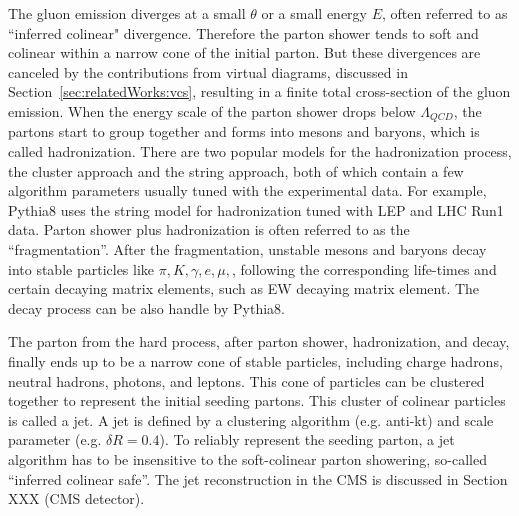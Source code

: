 \noindent The gluon emission diverges at a small $\theta$ or a small energy $E$, often referred to as ``inferred colinear" divergence. Therefore the parton shower tends to soft and colinear within a narrow cone of the initial parton. But these divergences are canceled by the contributions from virtual diagrams, discussed in Section~\ref{sec:relatedWorks:vcs}, resulting in a finite total cross-section of the gluon emission. When the energy scale of the parton shower drops below $\Lambda_{QCD}$, the partons start to group together and forms into mesons and baryons, which is called hadronization. There are two popular models for the hadronization process, the cluster approach and the string approach, both of which contain a few algorithm parameters usually tuned with the experimental data. For example, Pythia8 uses the string model for hadronization tuned with LEP and LHC Run1 data. Parton shower plus hadronization is often referred to as the ``fragmentation''. After the fragmentation, unstable mesons and baryons decay into stable particles like $\pi, K, \gamma, e, \mu, $, following the corresponding life-times and certain decaying matrix elements, such as EW decaying matrix element. The decay process can be also handle by Pythia8.

The parton from the hard process, after parton shower, hadronization, and decay, finally ends up to be a narrow cone of stable particles, including charge hadrons, neutral hadrons, photons, and leptons. This cone of particles can be clustered together to represent the initial seeding partons. This cluster of colinear particles is called a jet. A jet is defined by a clustering algorithm (e.g. anti-kt) and scale parameter (e.g. $\delta R=0.4$). To reliably represent the seeding parton, a jet algorithm has to be  insensitive to the soft-colinear parton showering, so-called ``inferred colinear safe''. The jet reconstruction in the CMS is discussed in Section XXX (CMS detector).


